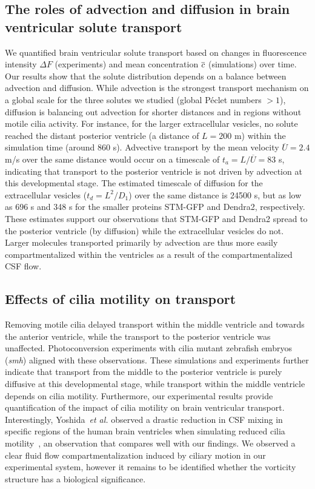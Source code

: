 \documentclass{WileyMSP-template}
\begin{document}
\subsection{The roles of advection and diffusion in brain ventricular solute transport}

We quantified brain ventricular solute transport based on changes in
fluorescence intensity $\Delta F$ (experiments) and mean concentration
$\overline{c}$ (simulations) over time. Our results show that the solute
distribution depends on a balance between advection and diffusion.
While advection is the strongest transport mechanism on a global scale
for the three solutes we studied (global Péclet numbers $> 1$),
diffusion is balancing out advection for shorter distances and in
regions without motile cilia activity.  For instance, for the larger
extracellular vesicles, no solute reached the distant posterior
ventricle (a distance of $L = 200$ \textmu m) within the simulation
time (around 860 s). Advective transport by the mean velocity
$\overline{U}=2.4$ \textmu m/s over the same distance would occur on a
timescale of $t_a=L/\overline{U}=83$ s, indicating that transport to
the posterior ventricle is not driven by advection at this
developmental stage. The estimated timescale of diffusion for the
extracellular vesicles ($t_d=L^2/D_1$) over the same distance is 24500
s, but as low as 696 s and 348 s for the smaller proteins STM-GFP and
Dendra2, respectively. These estimates support our observations that
STM-GFP and Dendra2 spread to the posterior ventricle (by diffusion)
while the extracellular vesicles do not. Larger molecules transported
primarily by advection are thus more easily compartmentalized within
the ventricles as a result of the compartmentalized CSF flow.

\subsection{Effects of cilia motility on transport}

Removing motile cilia delayed transport within
the middle ventricle and towards the anterior ventricle,
while the transport to the posterior ventricle was unaffected.
Photoconversion experiments with cilia mutant
zebrafish embryos (\emph{smh}) aligned with these observations.
These simulations and experiments further indicate that
transport from the middle to the posterior ventricle is
purely diffusive at this developmental stage,
while transport within the middle ventricle
depends on cilia motility.
Furthermore, our experimental results provide quantification
of the impact of cilia motility
on brain ventricular transport.
Interestingly, Yoshida~\emph{et al.} observed a drastic reduction
in CSF mixing in specific regions of the human brain
ventricles when simulating reduced cilia motility~\cite{Yoshida2022EffectVentricles},
an observation that compares well with our findings.  
We observed a clear fluid flow compartmentalization
induced by ciliary motion in our experimental system, however it remains to be
identified whether the vorticity structure has a biological significance.
\end{document}
